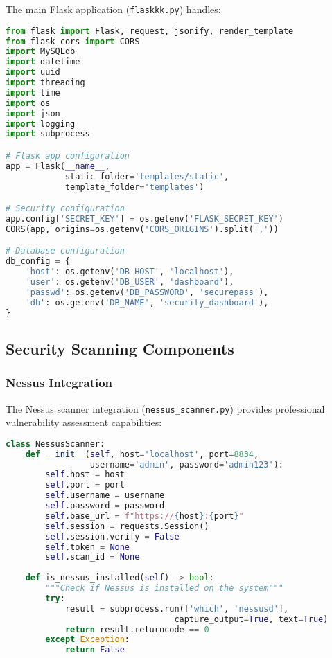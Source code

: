 \documentclass[12pt,a4paper]{report}
\begin{document}
The main Flask application (\texttt{flaskkk.py}) handles:

\begin{lstlisting}[language=Python, caption=Flask Application Structure]
from flask import Flask, request, jsonify, render_template
from flask_cors import CORS
import MySQLdb
import datetime
import uuid
import threading
import time
import os
import json
import logging
import subprocess

# Flask app configuration
app = Flask(__name__, 
            static_folder='templates/static',
            template_folder='templates')

# Security configuration
app.config['SECRET_KEY'] = os.getenv('FLASK_SECRET_KEY')
CORS(app, origins=os.getenv('CORS_ORIGINS').split(','))

# Database configuration
db_config = {
    'host': os.getenv('DB_HOST', 'localhost'),
    'user': os.getenv('DB_USER', 'dashboard'),
    'passwd': os.getenv('DB_PASSWORD', 'securepass'),
    'db': os.getenv('DB_NAME', 'security_dashboard'),
}
\end{lstlisting}

\subsection{Security Scanning Components}

\subsubsection{Nessus Integration}

The Nessus scanner integration (\texttt{nessus\_scanner.py}) provides professional vulnerability assessment capabilities:

\begin{lstlisting}[language=Python, caption=Nessus Scanner Class Structure]
class NessusScanner:
    def __init__(self, host='localhost', port=8834, 
                 username='admin', password='admin123'):
        self.host = host
        self.port = port
        self.username = username
        self.password = password
        self.base_url = f"https://{host}:{port}"
        self.session = requests.Session()
        self.session.verify = False
        self.token = None
        self.scan_id = None
        
    def is_nessus_installed(self) -> bool:
        """Check if Nessus is installed on the system"""
        try:
            result = subprocess.run(['which', 'nessusd'], 
                                  capture_output=True, text=True)
            return result.returncode == 0
        except Exception:
            return False
\end{lstlisting}
\end{document}
